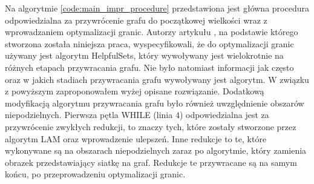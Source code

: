 \vspace{-8mm}
\label{code:main_impr_procedure}
\vspace{4mm}
Na algorytmie \ref{code:main_impr_procedure}
przedstawiona jest główna procedura odpowiedzialna za przywrócenie grafu do
początkowej wielkości wraz z wprowadzaniem optymalizacji granic.
Autorzy artykułu \cite{1364754}, na podstawie którego stworzona została niniejsza praca, wyspecyfikowali, że
do optymalizacji granic używany jest algorytm HelpfulSets, który
wywoływany jest wielokrotnie na różnych etapach przywracania grafu.
Nie było natomiast informacji jak często oraz w jakich stadiach przywracania grafu wywoływany jest algorytm.
W związku z powyższym zaproponowałem wyżej opisane rozwiązanie.
Dodatkową modyfikacją algorytmu przywracania grafu było również uwzględnienie obszarów niepodzielnych.
Pierwsza pętla WHILE (linia $4$) odpowiedzialna jest za przywrócenie zwykłych
redukcji, to znaczy tych, które zostały stworzone przez algorytm LAM oraz wprowadzenie ulepszeń.
Inne redukcje to te, które wykonywane są na obszarach niepodzielnych zaraz po
algorytmie, który zamienia obrazek przedstawiający siatkę na graf.
Redukcje te przywracane są na samym końcu, po przeprowadzeniu optymalizacji granic.

